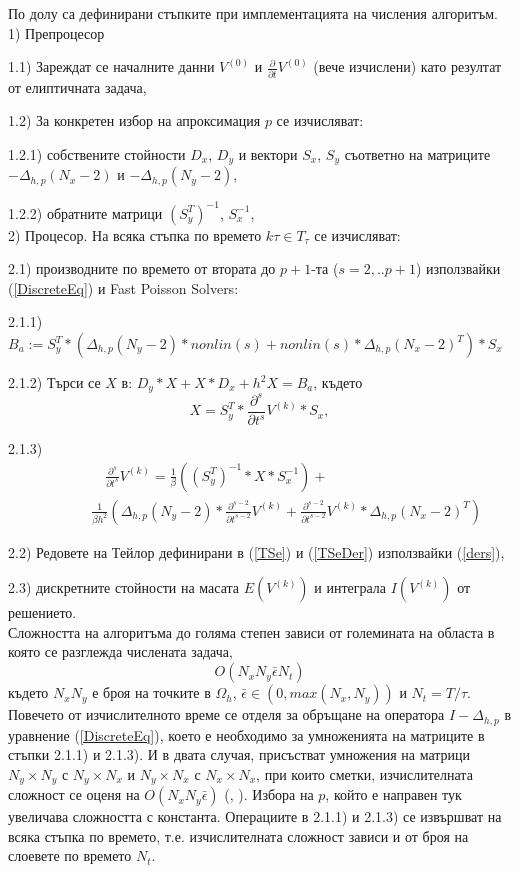\documentclass{article}
\newcommand{\rf}[1]{(\ref{#1})}
\begin{document}
По долу са дефинирани стъпките при имплементацията на числения алгоритъм.
\\
1) Препроцесор
\par
1.1) Зареждат се началните данни $V^{(0)}$ и $\frac{\partial}{\partial t} V^{(0)}$ (вече изчислени) като резултат от елиптичната задача,
\par
1.2) За конкретен избор на апроксимация $p$ се изчисляват:
\par
1.2.1) собствените стойности $D_x$, $D_y$ и вектори $S_x$, $S_y$ съответно на матриците $-\Delta_{h,p}(N_x-2)$ и $-\Delta_{h,p}(N_y-2)$, 
\par
1.2.2) обратните матрици $(S_y^T)^{-1}$, $S_x^{-1}$,
\\
2) Процесор. На всяка стъпка по времето $k\tau \in T_\tau$ се изчисляват:
\par
2.1) производните по времето от втората до $p+1$-та ($s=2,..p+1$) използвайки \rf{DiscreteEq} и Fast Poisson Solvers:
\par
2.1.1) $B_a:= S_y^T * ( \Delta_{h,p}(N_y-2) * nonlin(s) + nonlin(s) * \Delta_{h,p}(N_x-2)^T ) * S_x$
\par
2.1.2) Търси се $X$ в: $D_y * X + X * D_x + h^2 X= B_a$, където $$X=S_y^T *\frac{\partial^s}{\partial t^s} V^{(k)} * S_x,$$
\par
2.1.3)
\begin{align}\label{ders}
\quad \quad \quad & \quad  \frac{\partial^s}{\partial t^s} V^{(k)} = \frac{1}{\beta } \left ( (S_y^T)^{-1} * X * S_x^{-1} \right) + \nonumber\\
&\frac{1}{\beta h^2} \left (  \Delta_{h,p}(N_y-2) * \frac{\partial^{s-2}}{\partial t^{s-2}} V^{(k)} + \frac{\partial^{s-2}}{\partial t^{s-2}} V^{(k)} * \Delta_{h,p}(N_x-2)^T  \right) 
\end{align}
\par
2.2) Редовете на Тейлор дефинирани в \rf{TSe} и \rf{TSeDer} използвайки \rf{ders},
\par
2.3) дискретните стойности на масата $E(V^{(k)})$ и интеграла $I(V^{(k)})$ от решението.
\\
Сложността на алгоритъма до голяма степен зависи от големината на областа в която се разглежда числената задача,
$$ O( N_x N_y \bar \epsilon N_t ) $$
където $N_x N_y$ е броя на точките в $\Omega_h$, $\bar\epsilon \in (0, max(N_x,N_y) )$ и $N_t = T/\tau$. Повечето от изчислителното време се отделя за обръщане на оператора $I-\Delta_{h,p}$ в уравнение \rf{DiscreteEq}, което е необходимо за умноженията на матриците в стъпки 2.1.1) и 2.1.3). И в двата случая, присъстват умножения на матрици $N_y \times N_y$ с  $N_y \times N_x$ и $N_y \times N_x$ с  $N_x \times N_x$, при които сметки, изчислителната сложност се оценя на $ O( N_x N_y \bar\epsilon)$ (\cite{ref26}, \cite{ref27}). Избора на $p$, който е направен тук увеличава сложността с константа. Операциите в 2.1.1) и 2.1.3) се извършват на всяка стъпка по времето, т.е. изчислителната сложност зависи и от броя на слоевете по времето $N_t$.
\end{document}
